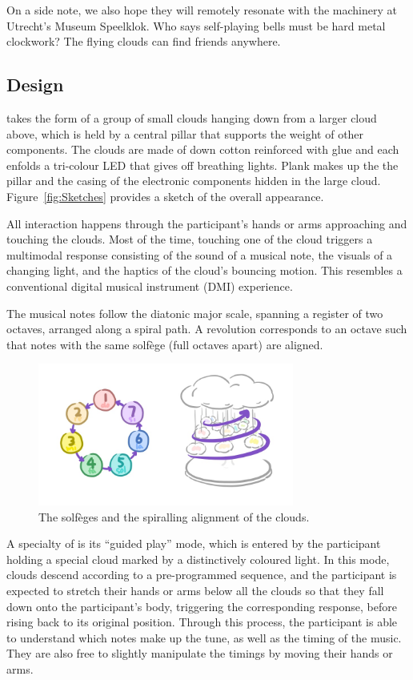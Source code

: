 \documentclass{nimemusic}
\begin{document}
On a side note, we also hope they will remotely resonate with the machinery at Utrecht's Museum Speelklok. Who says self-playing bells must be hard metal clockwork? The flying clouds can find friends anywhere.

\subsection{Design}
\CuHum{} takes the form of a group of small clouds hanging down from a larger cloud above, which is held by a central pillar that supports the weight of other components. The clouds are made of down cotton reinforced with glue and each enfolds a tri-colour LED that gives off breathing lights. Plank makes up the the pillar and the casing of the electronic components hidden in the large cloud. Figure~\ref{fig:Sketches} provides a sketch of the overall appearance.

All interaction happens through the participant's hands or arms approaching and touching the clouds. Most of the time, touching one of the cloud triggers a multimodal response consisting of the sound of a musical note, the visuals of a changing light, and the haptics of the cloud's bouncing motion. This resembles a conventional digital musical instrument (DMI) experience.

The musical notes follow the diatonic major scale, spanning a register of two octaves, arranged along a spiral path. A revolution corresponds to an octave such that notes with the same solf\`{e}ge (full octaves apart) are aligned.

\begin{figure}[h!]
  \includegraphics[width=0.75\textwidth]{../../images/CuHum_Solfege.jpg}
  \caption{The solf\`{e}ges and the spiralling alignment of the clouds.}
  \label{fig:Solfege}
\end{figure}

A specialty of \CuHum{} is its ``guided play'' mode, which is entered by the participant holding a special cloud marked by a distinctively coloured light. In this mode, clouds descend according to a pre-programmed sequence, and the participant is expected to stretch their hands or arms below all the clouds so that they fall down onto the participant's body, triggering the corresponding response, before rising back to its original position. Through this process, the participant is able to understand which notes make up the tune, as well as the timing of the music. They are also free to slightly manipulate the timings by moving their hands or arms.
\end{document}
